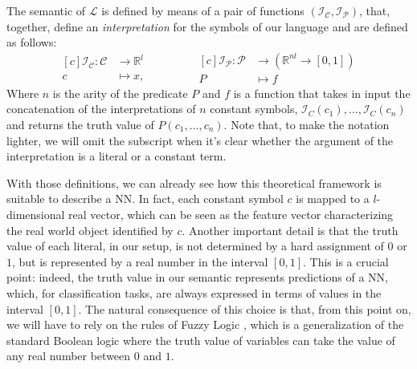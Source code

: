 \begin{definition}
	The semantic of $\mathcal{L}$ is defined by means of a pair of functions $\left( \mathcal{I}_{\mathcal{C}}, \mathcal{I}_{\mathcal{P}} \right)$, that, together, define an \textit{interpretation} for the symbols of our language and are defined as follows:
	\begin{equation}
	\begin{aligned}[c]
			\mathcal{I}_{\mathcal{C}}: \mathcal{C} &\longrightarrow \mathbb{R}^l\\
			c&\longmapsto x,
	\end{aligned}
	\qquad \qquad
	\begin{aligned}[c]
	\mathcal{I}_{\mathcal{P}}: \mathcal{P} &\longrightarrow \left( \mathbb{R}^{nl} \rightarrow \left[0,1\right] \right)\\
	P &\longmapsto f
	\end{aligned}
	\end{equation}	
	Where $n$ is the arity of the predicate $P$ and $f$ is a function that takes in input the concatenation of the interpretations of $n$ constant symbols, $\mathcal{I}_C(c_1), \dots, \mathcal{I}_C(c_n)$ and returns the truth value of $P(c_1,\dots,c_n)$. Note that, to make the notation lighter, we will omit the subscript when it's clear whether the argument of the interpretation is a literal or a constant term.
\end{definition}

With those definitions, we can already see how this theoretical framework is suitable to describe a NN. In fact, each constant symbol $c$ is mapped to a $l$-dimensional real vector, which can be seen as the feature vector characterizing the real world object identified by $c$. Another important detail is that the truth value of each literal, in our setup, is not determined by a hard assignment of $0$ or $1$, but is represented by a real number in the interval $\left[ 0,1 \right]$. 
\textcolor{unipd}{This is a crucial point: indeed, the truth value in our semantic represents predictions of a NN}, which, for classification tasks, are always expressed in terms of values in the interval $\left[0,1\right]$. The natural consequence of this choice is that, from this point on, we will have to rely on the rules of Fuzzy Logic \cite{novak1987first}, which is a generalization of the standard Boolean logic where the truth value of variables can take the value of any real number between $0$ and $1$. 

